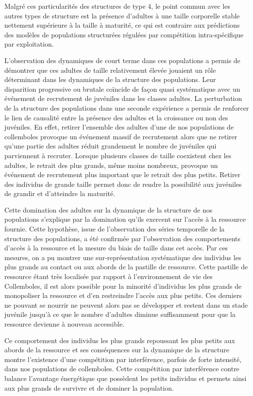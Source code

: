 Malgré ces particularités des structures de type 4, le point commun avec les
autres types de structure est la présence d'adultes à une taille corporelle
stable nettement supérieure à la taille à maturité, ce qui est contraire aux
prédictions des modèles de populations structurées régulées par compétition
intra-spécifique par exploitation.

L'observation des dynamiques de court terme dans ces populations a permis de
démontrer que ces adultes de taille relativement élevée jouaient un rôle
déterminant dans les dynamiques de la structure des populations. Leur
disparition progressive ou brutale coïncide de façon quasi systématique avec un
événement de recrutement de juvéniles dans les classes adultes. La perturbation
de la structure des populations dans une seconde expérience a permis de
renforcer le lien de causalité entre la présence des adultes et la croissance ou
non des juvéniles. En effet, retirer l'ensemble des adultes d'une de nos
populations de collemboles provoque un événement massif de recrutement alors que
ne retirer qu'une partie des adultes réduit grandement le nombre de juvéniles
qui parviennent à recruter. Lorsque plusieurs classes de taille coexistent chez
les adultes, le retrait des plus grands, même moins nombreux, provoque un
événement de recrutement plus important que le retrait des plus petits. Retirer
des individus de grande taille permet donc de rendre la possibilité aux
juvéniles de grandir et d'atteindre la maturité.

Cette domination des adultes sur la dynamique de la structure de nos populations
s'explique par la domination qu'ils exercent sur l'accès à la ressource fournie.
Cette hypothèse, issue de l'observation des séries temporelle de la structure
des populations, a été confirmée par l'observation des comportements d'accès à
la ressource et la mesure du biais de taille dans cet accès. Par ces mesures, on
a pu montrer une sur-représentation systématique des individus les plus grands
au contact ou aux abords de la pastille de ressource. Cette pastille de
ressource étant très localisée par rapport à l'environnement de vie des
Collemboles, il est alors possible pour la minorité d'individus les plus grands
de monopoliser la ressource et d'en restreindre l'accès aux plus petits. Ces
derniers ne pouvant se nourrir ne peuvent alors pas se développer et restent
dans un stade juvénile jusqu'à ce que le nombre d'adultes diminue suffisamment
pour que la ressource devienne à nouveau accessible.

Ce comportement des individus les plus grands repoussant les plus petits aux
abords de la ressource et ses conséquences sur la dynamique de la structure
montre l'existence d'une compétition par interférence, parfois de forte
intensité, dans nos populations de collemboles. Cette compétition par
interférence contre balance l'avantage énergétique que possèdent les petits
individus et permets ainsi aux plus grands de survivre et de dominer la
population.

